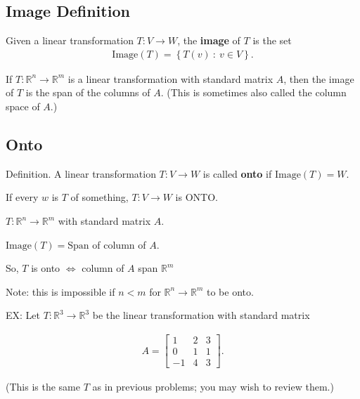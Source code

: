 \documentclass{package/notes}
\begin{document}
\subsection{Image Definition}
\begin{definition}[Image]

Given a linear transformation $T: V\rightarrow W$, the \textbf{image} of $T$ is the set
\begin{align*}
    \mathrm{Image}(T) = \left\{  T(v) \  : \  v \in V\right\} .
\end{align*}
\end{definition}

\begin{proposition}

    If $T: \mathbb{R}^n\rightarrow \mathbb{R}^m$ is a linear transformation with standard matrix $A$, then the image of $T$ is the span of the columns of $A$. (This is sometimes also called the column space of $A$.)
\end{proposition}


\subsection{Onto}
Definition. A linear transformation $T:V\rightarrow W$ is called \textbf{onto} if $\mathrm{Image}(T)=W$.



If every $w$ is $T$ of something, $T:V\rightarrow W$ is ONTO.

$T: \mathbb{R}^n\rightarrow \mathbb{R}^m$ with standard matrix $A$.

$\mathrm{Image}(T) = \mathrm{Span}$ of column of $A$.

So, $T$ is onto $\Leftrightarrow$ column of $A$ span $\mathbb{R}^m$

Note: this is impossible if $n<m$ for $\mathbb{R}^n\rightarrow \mathbb{R}^m$ to be onto.


EX:
Let $T:\mathbb{R}^3\rightarrow \mathbb{R}^3$ be the linear transformation with standard matrix

\begin{align*}
    A = \left[\begin{array}{ccc} 1 &  2 &  3 \\ 0 &  1 &  1 \\ -1 &  4 &  3 \end{array} \right].
\end{align*}

(This is the same $T$ as in previous problems; you may wish to review them.)
\end{document}
